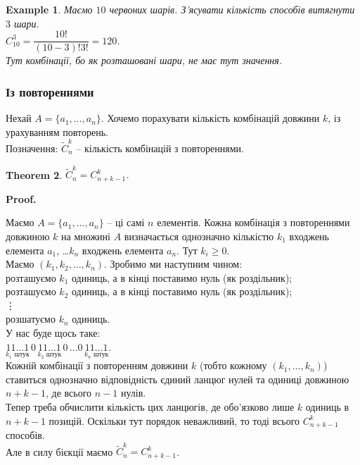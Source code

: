 \documentclass[a4paper, 14pt]{extarticle}
\makeatletter
\theoremstyle{theoremdd}
\newtheorem{theorem}{Theorem}[subsection]
\theoremstyle{theoremdd}
\theoremstyle{theoremdd}
\theoremstyle{theoremdd}
\theoremstyle{theoremdd}
\newtheorem{example}[theorem]{Example}
\theoremstyle{theoremdd}
\theoremstyle{theoremdd}
\theoremstyle{theoremdd}
\theoremstyle{theoremdd}
\theoremstyle{theoremdd}
\theoremstyle{theoremdd}
\theoremstyle{theoremdd}
\theoremstyle{theoremdd}
\theoremstyle{theoremdd}
\theoremstyle{theoremdd}
\renewenvironment{proof}[1][Proof.\\]{\par
\pushQED{\hfill \qed}%
\normalfont \topsep6\p@\@plus6\p@\relax
\trivlist
\item\relax
{\bfseries
#1\@addpunct{.}}\hspace\labelsep\ignorespaces
}{%
\popQED\endtrivlist\@endpefalse
}
\makeatother
\begin{document}
\begin{example}
Маємо $10$ червоних шарів. З'ясувати кількість способів витягнути $3$ шари.\\
$C_{10}^3 = \dfrac{10!}{(10-3)! 3!} = 120$.
\bigskip \\
Тут комбінації, бо як розташовані шари, не має тут значення.
\end{example}

\subsubsection*{Із повтореннями}
Нехай $A = \{a_1,\dots,a_n\}$. Хочемо порахувати кількість комбінацій довжини $k$, із урахуванням повторень.\\
Позначення: $\tilde{C}_n^k$ -- кількість комбінацій з повтореннями.

\begin{theorem}
$\tilde{C}_n^k = C_{n+k-1}^k$.
\end{theorem}

\begin{proof}
Маємо $A = \{a_1,\dots,a_n\}$ -- ці самі $n$ елементів. Кожна комбінація з повтореннями довжиною $k$ на множині $A$ визначається однозначно кількістю $k_1$ входжень елемента $a_1$, \dots $k_n$ входжень елемента $a_n$. Тут $k_i \geq 0$.\\
Маємо $(k_1,k_2,\dots,k_n)$. Зробимо ми наступним чином:\\
розташуємо $k_1$ одиниць, а в кінці поставимо нуль (як роздільник);\\
розташуємо $k_2$ одиниць, а в кінці поставимо нуль (як роздільник);\\
\vdots \\
розшатуємо $k_n$ одиниць.\\
У нас буде щось таке:\\
$\underset{k_1 \text{ штук}}{11 \dots 1}\,0\,\underset{k_2 \text{ штук}}{11 \dots 1}\,0\, \dots 0\,\underset{k_n \text{ штук}}{11 \dots 1}$.\\
Кожній комбінації з повторенням довжини $k$ (тобто кожному $(k_1,\dots,k_n)$) ставиться однозначно відповідність єдиний ланцюг нулей та одиниці довжиною $n+k-1$, де всього $n-1$ нулів. \\
Тепер треба обчислити кількість цих ланцюгів, де обо'язково лише $k$ одиниць в $n+k-1$ позицій. Оскільки тут порядок неважливий, то тоді всього $C_{n+k-1}^k$ способів.\\
Але в силу бієкції маємо $\tilde{C}_n^k = C_{n+k-1}^k$.
\end{proof}
\end{document}
